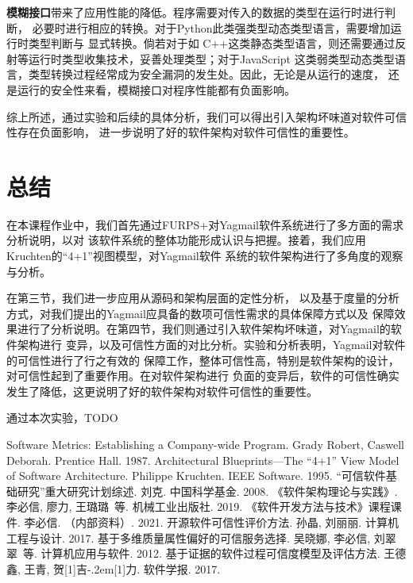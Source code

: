 \documentclass[UTF8,12pt,a4paper]{ctexart}
\begin{document}
    \textbf{模糊接口}带来了应用性能的降低。程序需要对传入的数据的类型在运行时进行判断，
    必要时进行相应的转换。对于Python此类强类型动态类型语言，需要增加运行时类型判断与
    显式转换。倘若对于如
    C++这类静态类型语言，则还需要通过反射等运行时类型收集技术，妥善处理类型；对于JavaScript
    这类弱类型动态类型语言，类型转换过程经常成为安全漏洞的发生处。因此，无论是从运行的速度，
    还是运行的安全性来看，模糊接口对程序性能都有负面影响。
    
    综上所述，通过实验和后续的具体分析，我们可以得出引入架构坏味道对软件可信性存在负面影响，
    进一步说明了好的软件架构对软件可信性的重要性。
    
\newpage
\section{总结}

    在本课程作业中，我们首先通过FURPS+对Yagmail软件系统进行了多方面的需求分析说明，以对
    该软件系统的整体功能形成认识与把握。接着，我们应用Kruchten的“4+1”视图模型，对Yagmail软件
    系统的软件架构进行了多角度的观察与分析。
    
    在第三节，我们进一步应用从源码和架构层面的定性分析，
    以及基于度量的分析方式，对我们提出的Yagmail应具备的数项可信性需求的具体保障方式以及
    保障效果进行了分析说明。在第四节，我们则通过引入软件架构坏味道，对Yagmail的软件架构进行
    变异，以及可信性方面的对比分析。实验和分析表明，Yagmail对软件的可信性进行了行之有效的
    保障工作，整体可信性高，特别是软件架构的设计，对可信性起到了重要作用。在对软件架构进行
    负面的变异后，软件的可信性确实发生了降低，这更说明了好的软件架构对软件可信性的重要性。

    通过本次实验，TODO

\begin{thebibliography}{99}
 Software Metrics: Establishing a Company-wide Program. Grady Robert, Caswell Deborah. Prentice Hall. 1987.
 Architectural Blueprints—The “4+1” View Model of Software Architecture. Philippe Kruchten. IEEE Software. 1995.
 “可信软件基础研究”重大研究计划综述. 刘克. 中国科学基金. 2008. 
 《软件架构理论与实践》. 李必信, 廖力, 王璐璐~等. 机械工业出版社. 2019.
 《软件开发方法与技术》课程课件. 李必信. （内部资料）. 2021.
 开源软件可信性评价方法. 孙晶, 刘丽丽. 计算机工程与设计. 2017.
 基于多维质量属性偏好的可信服务选择. 吴晓娜, 李必信, 刘翠翠~等. 计算机应用与软件. 2012.
 基于证据的软件过程可信度模型及评估方法. 王德鑫, 王青, 贺\hbox{\scalebox{0.6}[1]{吉}\kern-.2em\scalebox{0.6}[1]{力}}. 软件学报. 2017.
\end{thebibliography}
\end{document}
